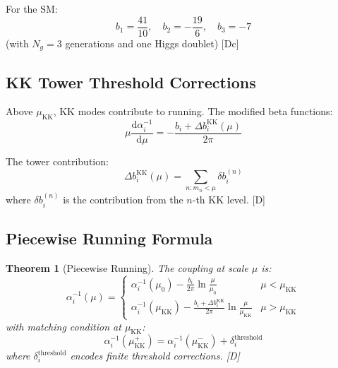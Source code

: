 \documentclass[11pt,a4paper]{article}
\newtheorem{theorem}{Theorem}[section]
\newcommand{\dd}{\mathrm{d}}
\begin{document}
For the SM:
\begin{equation}
b_1 = \frac{41}{10}, \quad b_2 = -\frac{19}{6}, \quad b_3 = -7
\label{eq:sm-betas}
\end{equation}
(with $N_g = 3$ generations and one Higgs doublet) [Dc]

\subsection{KK Tower Threshold Corrections}

Above $\mu_{\text{KK}}$, KK modes contribute to running. The modified beta functions:
\begin{equation}
\mu \frac{\dd \alpha_i^{-1}}{\dd \mu} = -\frac{b_i + \Delta b_i^{\text{KK}}(\mu)}{2\pi}
\label{eq:kk-running}
\end{equation}

The tower contribution:
\begin{equation}
\Delta b_i^{\text{KK}}(\mu) = \sum_{n: m_n < \mu} \delta b_i^{(n)}
\label{eq:tower-contribution}
\end{equation}
where $\delta b_i^{(n)}$ is the contribution from the $n$-th KK level. [D]

\subsection{Piecewise Running Formula}

\begin{theorem}[Piecewise Running]
\label{thm:piecewise}
The coupling at scale $\mu$ is:
\begin{equation}
\boxed{
\alpha_i^{-1}(\mu) = \begin{cases}
\alpha_i^{-1}(\mu_0) - \frac{b_i}{2\pi}\ln\frac{\mu}{\mu_0} & \mu < \mu_{\text{KK}} \\[1em]
\alpha_i^{-1}(\mu_{\text{KK}}) - \frac{b_i + \Delta b_i^{\text{KK}}}{2\pi}\ln\frac{\mu}{\mu_{\text{KK}}} & \mu > \mu_{\text{KK}}
\end{cases}
}
\label{eq:piecewise-running}
\end{equation}
with matching condition at $\mu_{\text{KK}}$:
\begin{equation}
\alpha_i^{-1}(\mu_{\text{KK}}^+) = \alpha_i^{-1}(\mu_{\text{KK}}^-) + \delta_i^{\text{threshold}}
\label{eq:threshold-match}
\end{equation}
where $\delta_i^{\text{threshold}}$ encodes finite threshold corrections. [D]
\end{theorem}
\end{document}
